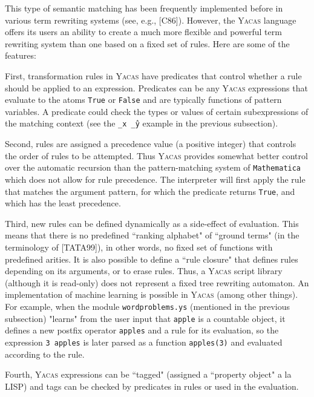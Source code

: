 \documentclass{llncs}
\begin{document}
This type of semantic matching has been frequently implemented before in
various term rewriting systems (see, e.g., [C86]). However, the \textsc{Yacas} language
offers its users an ability to create a much more flexible and powerful term
rewriting system than one based on a fixed set of rules. Here are some of the features:

First, transformation rules in \textsc{Yacas} have predicates that control whether a
rule should be applied to an expression. Predicates can be any \textsc{Yacas}
expressions that evaluate to the atoms \small{\texttt{True}} or \small{\texttt{False}} and are typically
functions of pattern variables. A predicate could check the types or
values of certain subexpressions of the matching context (see the \small{\texttt{\_x \^ \_y}}
example in the previous subsection).

Second, rules are assigned a precedence value (a positive integer) that
controls the order of rules to be attempted. Thus \textsc{Yacas} provides somewhat better control
over the automatic recursion than the pattern-matching system of \small{\texttt{Mathematica}}
which does not allow for rule precedence.
The interpreter will first apply the rule that matches the argument pattern,
for which the predicate returns \small{\texttt{True}}, and which has the least precedence.

Third, new rules can be defined dynamically as a side-effect of evaluation.
This means that there is no predefined ``ranking alphabet" of ``ground terms" (in
the terminology of [TATA99]), in other words, no fixed set of functions with
predefined arities. It is also possible to define a ``rule closure" that defines
rules depending on its arguments, or to erase rules. Thus, a \textsc{Yacas} script
library (although it is read-only) does not represent a fixed tree rewriting
automaton. An implementation of machine learning is possible in \textsc{Yacas} (among
other things). For example, when the module \small{\texttt{wordproblems.ys}} (mentioned in the previous subsection) "learns" from the
user input that \small{\texttt{apple}} is a countable object, it defines a new postfix
operator \small{\texttt{apples}} and a rule for its evaluation, so the expression \small{\texttt{3 apples}} is later parsed as a
function \small{\texttt{apples(3)}} and evaluated according to the rule.

Fourth, \textsc{Yacas} expressions can be ``tagged" (assigned a ``property object" a la
LISP) and tags can be checked by predicates in rules or used in the evaluation.
\end{document}
